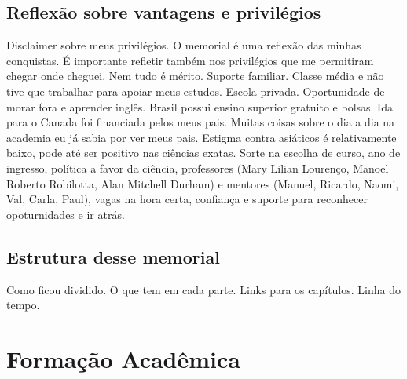 \documentclass[10pt,a4paper,oneside]{book}
\begin{document}
\section{Reflexão sobre vantagens e privilégios}

Disclaimer sobre meus privilégios.
O memorial é uma reflexão das minhas conquistas.
É importante refletir também nos privilégios que me permitiram chegar onde cheguei.
Nem tudo é mérito.
Suporte familiar.
Classe média e não tive que trabalhar para apoiar meus estudos.
Escola privada.
Oportunidade de morar fora e aprender inglês.
Brasil possui ensino superior gratuito e bolsas.
Ida para o Canada foi financiada pelos meus pais.
Muitas coisas sobre o dia a dia na academia eu já sabia por ver meus pais.
Estigma contra asiáticos é relativamente baixo, pode até ser positivo nas ciências exatas.
Sorte na escolha de curso, ano de ingresso, política a favor da ciência,
professores (Mary Lilian Lourenço, Manoel Roberto Robilotta, Alan Mitchell
Durham) e mentores (Manuel, Ricardo,
Naomi, Val, Carla, Paul), vagas na hora certa, confiança e suporte para reconhecer
opoturnidades e ir atrás.

\section{Estrutura desse memorial}

Como ficou dividido. O que tem em cada parte. Links para os capítulos. Linha do
tempo.

\chapter{Formação Acadêmica}
\label{cap_formacao}
\end{document}
